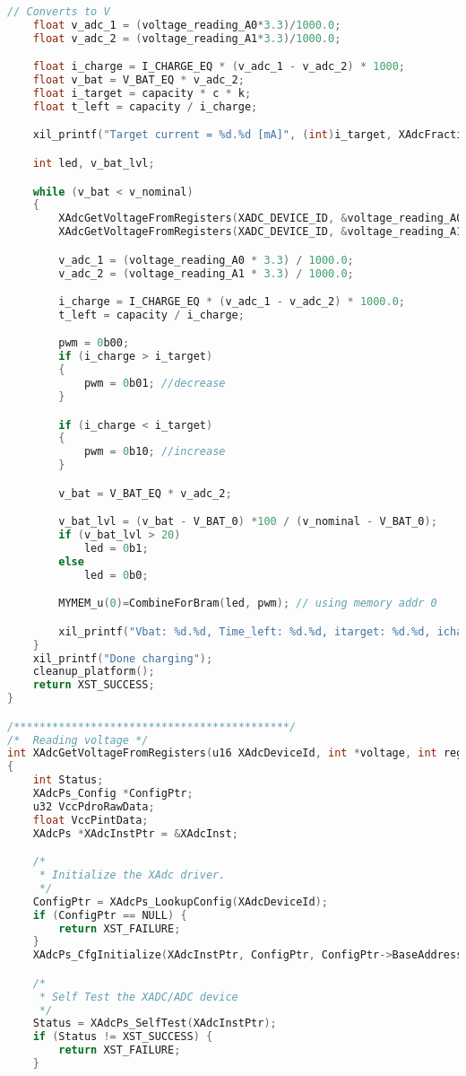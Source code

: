 \documentclass[../report.tex]{subfiles}
\begin{document}
\begin{lstlisting}[language=C, showstringspaces=false]
	// Converts to V
	float v_adc_1 = (voltage_reading_A0*3.3)/1000.0;
	float v_adc_2 = (voltage_reading_A1*3.3)/1000.0;

	float i_charge = I_CHARGE_EQ * (v_adc_1 - v_adc_2) * 1000;
	float v_bat = V_BAT_EQ * v_adc_2;
	float i_target = capacity * c * k;
	float t_left = capacity / i_charge;

	xil_printf("Target current = %d.%d [mA]", (int)i_target, XAdcFractionToInt(i_target));

	int led, v_bat_lvl;

	while (v_bat < v_nominal)
	{
		XAdcGetVoltageFromRegisters(XADC_DEVICE_ID, &voltage_reading_A0, 1); // read from A0
		XAdcGetVoltageFromRegisters(XADC_DEVICE_ID, &voltage_reading_A1, 9); // read from A1

		v_adc_1 = (voltage_reading_A0 * 3.3) / 1000.0;
		v_adc_2 = (voltage_reading_A1 * 3.3) / 1000.0;

		i_charge = I_CHARGE_EQ * (v_adc_1 - v_adc_2) * 1000.0;
		t_left = capacity / i_charge;

		pwm = 0b00;
		if (i_charge > i_target)
		{
			pwm = 0b01; //decrease
		}

		if (i_charge < i_target)
		{
			pwm = 0b10; //increase
		}

		v_bat = V_BAT_EQ * v_adc_2;

		v_bat_lvl = (v_bat - V_BAT_0) *100 / (v_nominal - V_BAT_0);
		if (v_bat_lvl > 20)
			led = 0b1;
		else
			led = 0b0;

		MYMEM_u(0)=CombineForBram(led, pwm); // using memory addr 0

		xil_printf("Vbat: %d.%d, Time_left: %d.%d, itarget: %d.%d, icharge: %d.%d\n\r", (int)v_bat, float2Int(v_bat),(int)t_left, float2Int(t_left), (int)i_target, float2Int(i_target), (int)i_charge, float2Int(i_charge));
	}
	xil_printf("Done charging");
	cleanup_platform();
	return XST_SUCCESS;
}

/*******************************************/
/*	Reading voltage */
int XAdcGetVoltageFromRegisters(u16 XAdcDeviceId, int *voltage, int register_offset)
{
	int Status;
	XAdcPs_Config *ConfigPtr;
	u32 VccPdroRawData;
	float VccPintData;
	XAdcPs *XAdcInstPtr = &XAdcInst;

	/*
	 * Initialize the XAdc driver.
	 */
	ConfigPtr = XAdcPs_LookupConfig(XAdcDeviceId);
	if (ConfigPtr == NULL) {
		return XST_FAILURE;
	}
	XAdcPs_CfgInitialize(XAdcInstPtr, ConfigPtr, ConfigPtr->BaseAddress);

	/*
	 * Self Test the XADC/ADC device
	 */
	Status = XAdcPs_SelfTest(XAdcInstPtr);
	if (Status != XST_SUCCESS) {
		return XST_FAILURE;
	}


\end{lstlisting}
\end{document}
